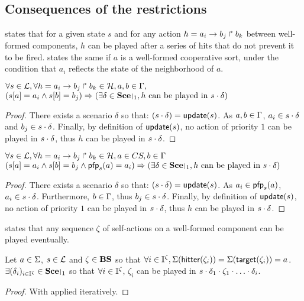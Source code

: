 \subsection{Consequences of the restrictions}
 states that for a given state $s$ and for any action $h = a_i\rightarrow b_j\Rsh b_k$ between well-formed components, $h$ can be played after a series of hits that do not prevent it to be fired.
 states the same if $a$ is a well-formed cooperative sort, under the condition that $a_i$ reflects the state of the neighborhood of $a$.
\begin{theorem}
\label{th:hcompcomp}
  $\forall s \in \mathcal{L}, \forall h = a_i\rightarrow b_j\Rsh b_k \in \mathcal{H}, a,b \in \Gamma,$\\
  $(\PHget{s}{a} = a_i \wedge \PHget{s}{b} = b_j) \Rightarrow (\exists \delta \in \restriction{\Sce}{1}, \text{$h$ can be played in $s \PHplay \delta$})$
\end{theorem}
\begin{proof}
  There exists a scenario $\delta$ so that: $(s \cdot \delta) = \mathsf{update}(s)$.
  As $a,b \in \Gamma$, $a_i \in s \cdot \delta$ and $b_j \in s \cdot \delta$.
  Finally, by definition of $\mathsf{update}(s)$, no action of priority $1$ can be played in $s \cdot \delta$, thus $h$ can be played in $s \cdot \delta$.
\end{proof}
\begin{theorem}
\label{th:hcscomp}
  $\forall s \in \mathcal{L}, \forall h = a_i\rightarrow b_j\Rsh b_k \in \mathcal{H}, a \in CS, b \in \Gamma$\\
  $(\PHget{s}{a} = a_i \wedge \PHget{s}{b} = b_j \wedge \pfp_s(a) = a_i) \Rightarrow (\exists \delta \in \restriction{\Sce}{1}, \text{$h$ can be played in $s \PHplay \delta$})$
\end{theorem}
\begin{proof}
  There exists a scenario $\delta$ so that: $(s \cdot \delta) = \mathsf{update}(s)$.
  As $a_i \in \mathsf{pfp}_s(a)$, $a_i \in s \cdot \delta$.
  Furthermore, $b \in \Gamma$, thus $b_j \in s \cdot \delta$.
  Finally, by definition of $\mathsf{update}(s)$, no action of priority $1$ can be played in $s \cdot \delta$, thus $h$ can be played in $s \cdot \delta$.
\end{proof}

 states that any sequence $\zeta$ of self-actions on a well-formed component can be played eventually.
\begin{theorem}
\label{th:autohits}
  Let $a \in \Sigma$, $s \in \mathcal{L}$ and $\zeta \in \mathbf{BS}$ so that $\forall i \in \mathbb{I}^{\zeta}, \Sigma(\mathsf{hitter}(\zeta_i)) = \Sigma(\mathsf{target}(\zeta_i)) = a$.
  $\exists (\delta_i)_{i \in \indexes{\zeta}} \in \restriction{\Sce}{1}$ so that $\forall i \in \mathbb{I}^{\zeta}$, $\zeta_i$ can be played in $s \PHplay \delta_1 \PHplay \zeta_1 \PHplay \dots \PHplay \delta_i$. 
\end{theorem}
\begin{proof}
  With  applied iteratively.
\end{proof}

